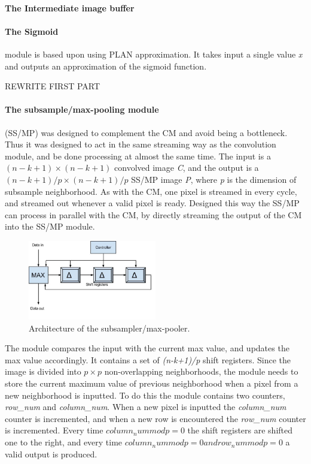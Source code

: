 \paragraph{The Intermediate image buffer}

\paragraph{The Sigmoid} module is based upon \cite{Napocensis2009} using PLAN approximation. It takes input a single value \textit{x} and outputs an approximation of the sigmoid function.

\vspace*{1\baselineskip}
REWRITE FIRST PART
\paragraph{The subsample/max-pooling module} (SS/MP) was designed to complement the CM and avoid being a bottleneck. Thus it was designed to act in the same streaming way as the convolution module, and be done processing at almost the same time. The input is a $ (n-k+1) \times (n-k+1) $ convolved image \textit{C}, and the output is a $ (n-k+1)/p \times (n-k+1)/p $ SS/MP image \textit{P}, where \textit{p} is the dimension of subsample neighborhood. As with the CM, one pixel is streamed in every cycle, and streamed out whenever a valid pixel is ready. Designed this way the SS/MP can process in parallel with the CM, by directly streaming the output of the CM into the SS/MP module. 

\begin{figure}[h!]
  \centering
      \includegraphics[width=0.5\textwidth]{Figures/Method/submax}
  \caption{Architecture of the subsampler/max-pooler.}
\end{figure}

The module compares the input with the current max value, and updates the max value accordingly. It contains a set of \textit{(n-k+1)/p} shift registers. Since the image is divided into $ p \times p $ non-overlapping neighborhoods, the module needs to store the current maximum value of previous neighborhood when a pixel from a new neighborhood is inputted. To do this the module contains two counters, \textit{row\_num} and \textit{column\_num}. When a new pixel is inputted the \textit{column\_num} counter is incremented, and when a new row is encountered the \textit{row\_num} counter is incremented. Every time $ column_num mod p = 0 $ the shift registers are shifted one to the right, and every time $ column_num mod p = 0 and row_num mod p = 0 $ a valid output is produced. 

